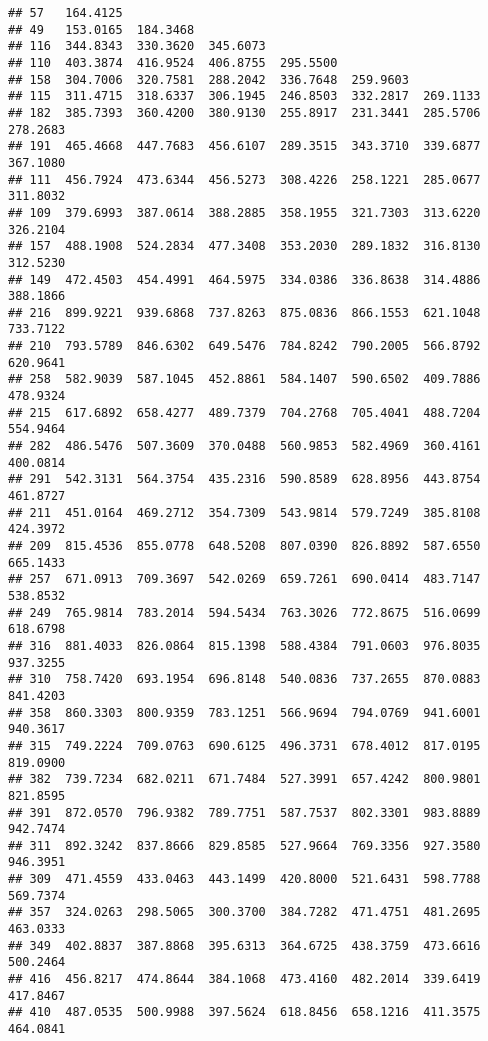 \documentclass[
]{article}
\begin{document}
\begin{verbatim}
## 57   164.4125                                                            
## 49   153.0165  184.3468                                                  
## 116  344.8343  330.3620  345.6073                                        
## 110  403.3874  416.9524  406.8755  295.5500                              
## 158  304.7006  320.7581  288.2042  336.7648  259.9603                    
## 115  311.4715  318.6337  306.1945  246.8503  332.2817  269.1133          
## 182  385.7393  360.4200  380.9130  255.8917  231.3441  285.5706  278.2683
## 191  465.4668  447.7683  456.6107  289.3515  343.3710  339.6877  367.1080
## 111  456.7924  473.6344  456.5273  308.4226  258.1221  285.0677  311.8032
## 109  379.6993  387.0614  388.2885  358.1955  321.7303  313.6220  326.2104
## 157  488.1908  524.2834  477.3408  353.2030  289.1832  316.8130  312.5230
## 149  472.4503  454.4991  464.5975  334.0386  336.8638  314.4886  388.1866
## 216  899.9221  939.6868  737.8263  875.0836  866.1553  621.1048  733.7122
## 210  793.5789  846.6302  649.5476  784.8242  790.2005  566.8792  620.9641
## 258  582.9039  587.1045  452.8861  584.1407  590.6502  409.7886  478.9324
## 215  617.6892  658.4277  489.7379  704.2768  705.4041  488.7204  554.9464
## 282  486.5476  507.3609  370.0488  560.9853  582.4969  360.4161  400.0814
## 291  542.3131  564.3754  435.2316  590.8589  628.8956  443.8754  461.8727
## 211  451.0164  469.2712  354.7309  543.9814  579.7249  385.8108  424.3972
## 209  815.4536  855.0778  648.5208  807.0390  826.8892  587.6550  665.1433
## 257  671.0913  709.3697  542.0269  659.7261  690.0414  483.7147  538.8532
## 249  765.9814  783.2014  594.5434  763.3026  772.8675  516.0699  618.6798
## 316  881.4033  826.0864  815.1398  588.4384  791.0603  976.8035  937.3255
## 310  758.7420  693.1954  696.8148  540.0836  737.2655  870.0883  841.4203
## 358  860.3303  800.9359  783.1251  566.9694  794.0769  941.6001  940.3617
## 315  749.2224  709.0763  690.6125  496.3731  678.4012  817.0195  819.0900
## 382  739.7234  682.0211  671.7484  527.3991  657.4242  800.9801  821.8595
## 391  872.0570  796.9382  789.7751  587.7537  802.3301  983.8889  942.7474
## 311  892.3242  837.8666  829.8585  527.9664  769.3356  927.3580  946.3951
## 309  471.4559  433.0463  443.1499  420.8000  521.6431  598.7788  569.7374
## 357  324.0263  298.5065  300.3700  384.7282  471.4751  481.2695  463.0333
## 349  402.8837  387.8868  395.6313  364.6725  438.3759  473.6616  500.2464
## 416  456.8217  474.8644  384.1068  473.4160  482.2014  339.6419  417.8467
## 410  487.0535  500.9988  397.5624  618.8456  658.1216  411.3575  464.0841

\end{verbatim}
\end{document}
